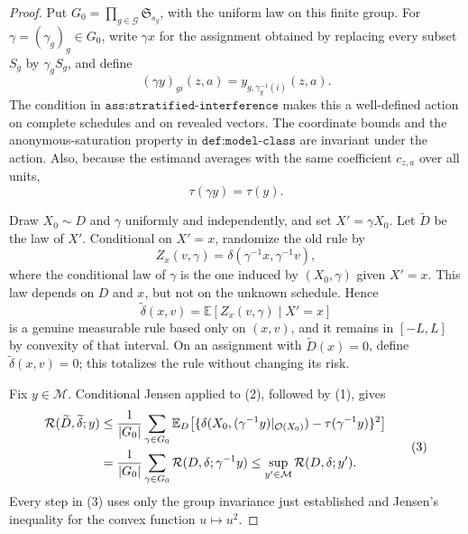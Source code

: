 \documentclass{article}
\begin{document}
\begin{proof}
Put \(G_0=\prod_{g\in\mathcal G}\mathfrak S_{s_g}\), with the uniform law on this finite group.  For \(\gamma=(\gamma_g)_g\in G_0\), write \(\gamma x\) for the assignment obtained by replacing every subset \(S_g\) by \(\gamma_gS_g\), and define
\[
 (\gamma y)_{gi}(z,a)=y_{g,\gamma_g^{-1}(i)}(z,a).
\]
The condition in \(\texttt{ass:stratified-interference}\) makes this a well-defined action on complete schedules and on revealed vectors.  The coordinate bounds and the anonymous-saturation property in \(\texttt{def:model-class}\) are invariant under the action.  Also, because the estimand averages with the same coefficient \(c_{z,a}\) over all units,
\[
 \tau(\gamma y)=\tau(y).                                                    \tag{1}
\]

Draw \(X_0\sim D\) and \(\gamma\) uniformly and independently, and set \(X'=\gamma X_0\).  Let \(\widetilde D\) be the law of \(X'\).  Conditional on \(X'=x\), randomize the old rule by
\[
 Z_x(v,\gamma)=\delta(\gamma^{-1}x,\gamma^{-1}v),
\]
where the conditional law of \(\gamma\) is the one induced by \((X_0,\gamma)\) given \(X'=x\).  This law depends on \(D\) and \(x\), but not on the unknown schedule.  Hence
\[
 \widetilde\delta(x,v)
   =\mathbb E[Z_x(v,\gamma)\mid X'=x]                                      \tag{2}
\]
is a genuine measurable rule based only on \((x,v)\), and it remains in \([-L,L]\) by convexity of that interval.
On an assignment with \(\widetilde D(x)=0\), define \(\widetilde\delta(x,v)=0\); this totalizes the rule without changing its risk.

Fix \(y\in\mathcal M\).  Conditional Jensen applied to (2), followed by (1), gives
\[
\begin{aligned}
 \mathcal R(\widetilde D,\widetilde\delta;y)
 &\le {1\over |G_0|}\sum_{\gamma\in G_0}
     \mathbb E_D\!\left[
       \{\delta(X_0,(\gamma^{-1}y)|_{\mathcal O(X_0)})
           -\tau(\gamma^{-1}y)\}^2\right]  \\
 &={1\over |G_0|}\sum_{\gamma\in G_0}
       \mathcal R(D,\delta;\gamma^{-1}y)
 \le \sup_{y'\in\mathcal M}\mathcal R(D,\delta;y').
\end{aligned}                                                              \tag{3}
\]
Every step in (3) uses only the group invariance just established and Jensen's inequality for the convex function \(u\mapsto u^2\).


\end{proof}
\end{document}
